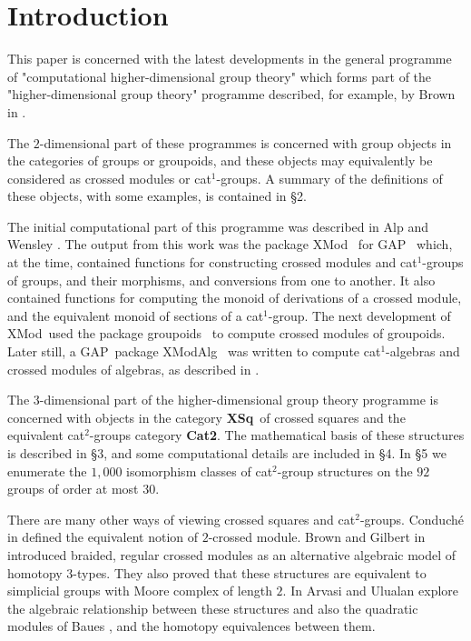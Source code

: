 \documentclass{ws-ijac}
\newcommand{\GAP}      {{\sf GAP}}
\newcommand{\groupoids}{{\sf groupoids}}
\newcommand{\XMod}     {{\sf XMod}}
\newcommand{\XModAlg}  {{\sf XModAlg}}
\newcommand{\catCatt}   {{\bf Cat2}}
\newcommand{\catXSq}    {{\bf XSq}}
\begin{document}

\section{Introduction}

This paper is concerned with the latest developments in the general programme 
of "computational higher-dimensional group theory" which forms part of the 
"higher-dimensional group theory" programme described, for example, 
by Brown in \cite{brown-lms}. 

The $2$-dimensional part of these programmes is concerned with group objects 
in the categories of groups or groupoids, and these objects may equivalently 
be considered as crossed modules or cat$^1$-groups. 
A summary of the definitions of these objects, 
with some examples, is contained in \S 2. 

The initial computational part of this programme was described in 
Alp and Wensley \cite{alp-wensley-ijac}. 
The output from this work was the package \XMod\ \cite{xmod} 
for \GAP\ \cite{gap} which, at the time, 
contained functions for constructing crossed modules and cat$^1$-groups of groups, and their morphisms, and conversions from one to another. 
It also contained functions for computing the monoid of derivations of a 
crossed module, and the equivalent monoid of sections of a cat$^1$-group. 
The next development of \XMod\ used the package \groupoids\ 
\cite{groupoids} to compute crossed modules of groupoids. 
Later still, a \GAP\ package \XModAlg\ \cite{xmodalg} 
was written to compute cat$^1$-algebras and crossed modules of algebras, 
as described in \cite{arvasi-odabas}. 

The $3$-dimensional part of the higher-dimensional group theory programme 
is concerned with objects in the category \catXSq\ of crossed squares 
and the equivalent cat$^2$-groups category \catCatt. 
The mathematical basis of these structures is described in \S 3, 
and some computational details are included in \S 4. 
In \S 5 we enumerate the $1,000$ isomorphism 
classes of cat$^2$-group structures on the $92$ groups of order at most $30$. 

There are many other ways of viewing crossed squares and cat$^2$-groups. 
Conduch\'{e} in \cite{conduche} defined the equivalent notion of 
$2$-crossed module.
Brown and Gilbert in \cite{brown-gilbert} introduced braided, 
regular crossed modules as an alternative algebraic model of homotopy $3$-types. 
They also proved that these structures are equivalent to simplicial groups 
with Moore complex of length $2$. 
In \cite{arvasi-ulualan} Arvasi and Ulualan explore the algebraic relationship 
between these structures and also the quadratic modules of Baues \cite{baues}, 
and the homotopy equivalences between them. 
\end{document}
